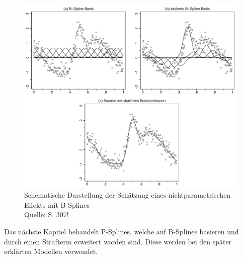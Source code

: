\begin{figure}[H]
	\centering
	\includegraphics[width=.9\textwidth]{plots/b_spline.png}
	\caption{Schematische Darstellung der Schätzung eines nichtparametrischen Effekts mit B-Splines \\
	Quelle: S. 307!}
	\label{pic:b_spline}
\end{figure}

\noindent Das nächste Kapitel behandelt P-Splines, welche auf B-Splines basieren und durch einen Strafterm erweitert worden sind. Diese werden  bei den später erklärten Modellen verwendet.

